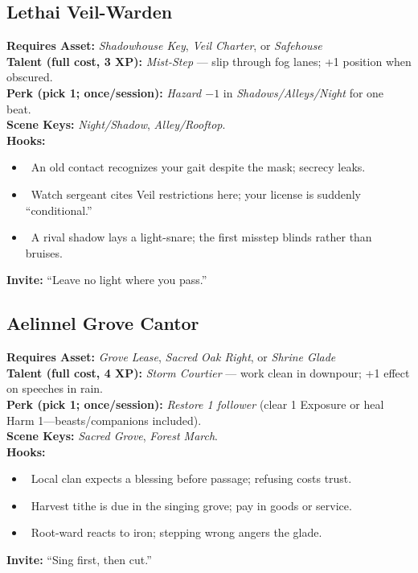 \documentclass[11pt]{article}
\begin{document}
\subsection*{Lethai Veil-Warden}
\textbf{Requires Asset:} \emph{Shadowhouse Key}, \emph{Veil Charter}, or \emph{Safehouse}\\
\textbf{Talent (full cost, 3 XP):} \emph{Mist-Step} — slip through fog lanes; +1 position when obscured.\\
\textbf{Perk (pick 1; once/session):} \emph{Hazard $-1$} in \emph{Shadows/Alleys/Night} for one beat.\\
\textbf{Scene Keys:} \emph{Night/Shadow}, \emph{Alley/Rooftop}.\\[2pt]
\textbf{Hooks:}
\begin{itemize}
  \item \heartsuit~An old contact recognizes your gait despite the mask; secrecy leaks.
  \item \clubsuit~Watch sergeant cites Veil restrictions here; your license is suddenly “conditional.”
  \item \spadesuit~A rival shadow lays a light-snare; the first misstep blinds rather than bruises.
\end{itemize}
\textbf{Invite:} “Leave no light where you pass.”

\subsection*{Aelinnel Grove Cantor}
\textbf{Requires Asset:} \emph{Grove Lease}, \emph{Sacred Oak Right}, or \emph{Shrine Glade}\\
\textbf{Talent (full cost, 4 XP):} \emph{Storm Courtier} — work clean in downpour; +1 effect on speeches in rain.\\
\textbf{Perk (pick 1; once/session):} \emph{Restore 1 follower} (clear 1 Exposure or heal Harm 1—beasts/companions included).\\
\textbf{Scene Keys:} \emph{Sacred Grove}, \emph{Forest March}.\\[2pt]
\textbf{Hooks:}
\begin{itemize}
  \item \heartsuit~Local clan expects a blessing before passage; refusing costs trust.
  \item \diamondsuit~Harvest tithe is due in the singing grove; pay in goods or service.
  \item \spadesuit~Root-ward reacts to iron; stepping wrong angers the glade.
\end{itemize}
\textbf{Invite:} “Sing first, then cut.”
\end{document}
